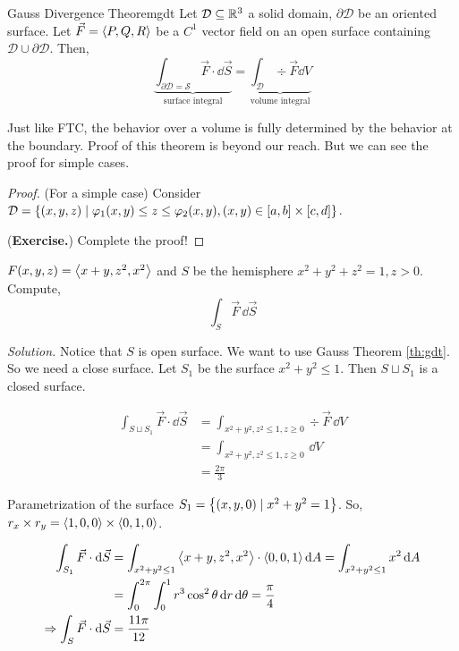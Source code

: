 \documentclass[../Analysis-3.tex]{subfiles}
\begin{document}
\begin{Thm}{Gauss Divergence Theorem}{gdt}
  Let $\mathcal{D} \subseteq \mathbb{R}^3$ a solid domain, $\partial{\mathcal{D}}$ be an oriented surface. Let $\vec{F} = \left\langle {P}, {Q,R} \right\rangle$ be a $C^1$ vector field on an open surface containing $\mathcal{D} \cup \partial{\mathcal{D}}$. Then,
  \[
    \underbrace{\int_{\partial{\mathcal{D}} = \mathcal{S}} \vec{F}\cdot \dd{\vec{S}}}_\text{surface integral} = \underbrace{\int_{\mathcal{D}} \div \vec{F} \dd{V}}_\text{volume integral}
  \]
\end{Thm}

Just like FTC, the behavior over a volume is fully determined by the behavior at the boundary. Proof of this theorem is beyond our reach. But we can see the proof for simple cases.

\begin{proof}
  (For a simple case) Consider $\mathcal{D} = \qty{(x,y,z) \mid \varphi_1(x,y) \leq z \leq \varphi_2(x,y), (x,y) \in [a,b]\times [c,d]}$.

  (\textbf{Exercise.}) Complete the proof!
\end{proof}


\begin{Eg}{}{}
  $F (x,y,z) = \left\langle {x+y}, {z^2,x^2} \right\rangle$ and $S$ be the hemisphere $x^2+y^2+z^2 = 1, z>0$. Compute,
  \[\int_{S} \vec{F} \, \dd \vec{S}\]

  \textit{Solution.} Notice that $S$ is open surface. We want to  use Gauss Theorem \ref{th:gdt}. So we need a close surface. Let $S_1$ be the surface $x^2 +y^2 \leq 1$. Then $S \sqcup S_1$ is a closed surface.

  \begin{align*}
    \int_{S \sqcup S_1} \vec{F}\cdot \dd \vec{S}
     & = \int_{x^2+y^2,z^2 \leq 1, z \ge 0} \div \vec{F} \, \dd{V} \\
     & = \int_{x^2+y^2,z^2 \leq 1, z \ge 0}\,\dd{V}                \\
     & = \frac{2\pi}{3}
  \end{align*}

  Parametrization of the surface $S_1 =\qty{(x,y,0) \mid x^2+y^2 = 1}$. So, $r_x \times r_y = \left\langle {1,0}, {0} \right\rangle \times \left\langle {0,1}, {0} \right\rangle$.

  \begin{align*}
    \int_{S_1} \vec{F} \cdot \dd \vec{S}
     & = \int_{x^2+y^2 \leq 1} \left\langle {x+y}, {z^2,x^2} \right\rangle \cdot \left\langle {0,0}, {1} \right\rangle \dd{A} = \int_{x^2+y^2 \leq 1} x^2 \dd{A} \\
     & = \int_{0}^{2\pi} \int_{0}^{1} r^3 \cos^2 \theta \, \dd r \, \dd\theta = \frac{\pi}{4}                         \\
    \Rightarrow \int_{S} \vec{F} \cdot \dd \vec{S}
     & = \frac{11\pi}{12}
  \end{align*}
\end{Eg}
\end{document}
